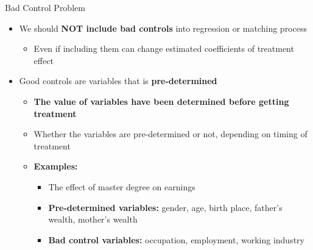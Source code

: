 \documentclass[dvipsnames,hyperref={pdfpagelabels=false}]{beamer}
\begin{document}
\begin{frame}{Bad Control Problem}
	\begin{itemize} 
		\item We should \textbf{NOT include bad controls} into regression or matching process 
				\vspace{0.2cm}
			\begin{itemize} 
		\item Even if including them can change estimated coefficients of treatment effect
		\vspace{0.2cm}
			\end{itemize}
		\item Good controls are variables that is \textbf{pre-determined}
		\vspace{0.2cm}
		\begin{itemize}
			\item \textbf{The value of variables have been determined before getting treatment}	
			\vspace{0.2cm}	
			
			\item Whether the variables are pre-determined or not, depending on timing of treatment
			\vspace{0.2cm}	
			\item \textbf{Examples:} 
			\begin{itemize}
				\vspace{0.2cm}	
				\item The effect of master degree on earnings	
				\vspace{0.2cm}			
				\item \textbf{Pre-determined variables:} gender, age, birth place, father's wealth, mother's wealth
				\vspace{0.2cm}	
				\item \textbf{Bad control variables:} occupation, employment, working industry			
			\end{itemize}
			
		\end{itemize}
		
	\end{itemize}
\end{frame}
\end{document}
